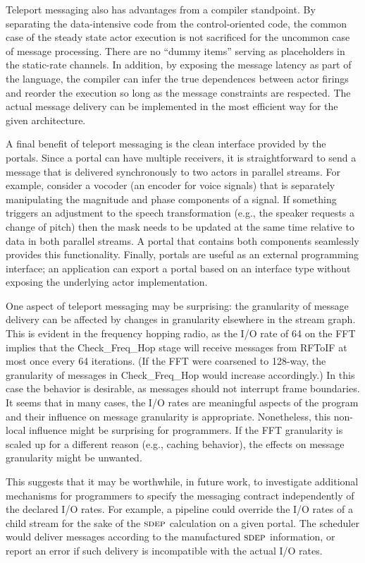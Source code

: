 Teleport messaging also has advantages from a compiler standpoint.  By
separating the data-intensive code from the control-oriented code, the
common case of the steady state actor execution is not sacrificed for
the uncommon case of message processing.  There are no ``dummy items''
serving as placeholders in the static-rate channels.  In addition, by
exposing the message latency as part of the language, the compiler can
infer the true dependences between actor firings and reorder the
execution so long as the message constraints are respected.  The
actual message delivery can be implemented in the most efficient way
for the given architecture.

A final benefit of teleport messaging is the clean interface provided
by the portals.  Since a portal can have multiple receivers, it is
straightforward to send a message that is delivered synchronously to
two actors in parallel streams.  For example, consider a vocoder (an
encoder for voice signals) that is separately manipulating the
magnitude and phase components of a signal.  If something triggers an
adjustment to the speech transformation (e.g., the speaker
requests a change of pitch) then the mask needs to be updated at the
same time relative to data in both parallel streams.  A portal that
contains both components seamlessly provides this functionality.
Finally, portals are useful as an external programming interface; an
application can export a portal based on an interface type without
exposing the underlying actor implementation.

One aspect of teleport messaging may be surprising: the granularity of
message delivery can be affected by changes in granularity elsewhere
in the stream graph.  This is evident in the frequency hopping radio,
as the I/O rate of 64 on the FFT implies that the Check\_Freq\_Hop
stage will receive messages from RFToIF at most once every 64
iterations.  (If the FFT were coarsened to 128-way, the granularity of
messages in Check\_Freq\_Hop would increase accordingly.)  In this
case the behavior is desirable, as messages should not interrupt frame
boundaries.  It seems that in many cases, the I/O rates are meaningful
aspects of the program and their influence on message granularity is
appropriate.  Nonetheless, this non-local influence might be
surprising for programmers.  If the FFT granularity is scaled up for a
different reason (e.g., caching behavior), the effects on message
granularity might be unwanted.

This suggests that it may be worthwhile, in future work, to
investigate additional mechanisms for programmers to specify the
messaging contract independently of the declared I/O rates.  For
example, a pipeline could override the I/O rates of a child stream for
the sake of the $\textsc{sdep}$ calculation on a given portal.  The scheduler
would deliver messages according to the manufactured $\textsc{sdep}$
information, or report an error if such delivery is incompatible with
the actual I/O rates.
